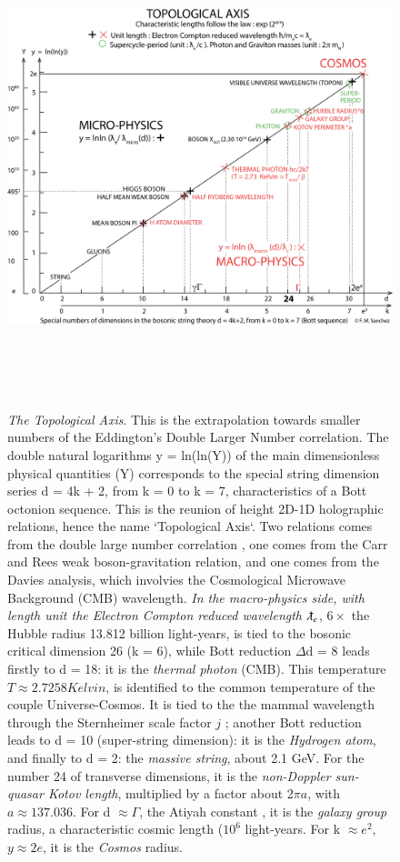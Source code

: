 \documentclass[a4paper,9pt]{article}
\begin{document}
\begin{appendix}
\begin{figure}
\label{fig:7:fig1}
\centering
\includegraphics[width=\textwidth,height=14cm]{./figure/figure}
\caption{\textit{The Topological Axis}. This is the extrapolation towards smaller numbers of the Eddington's Double Larger Number correlation. The double natural logarithms y = ln(ln(Y)) of the main dimensionless physical quantities (Y) corresponds to the special string dimension series d = 4k + 2, from k = 0 to k = 7, characteristics of a Bott octonion sequence. This is the reunion of height 2D-1D holographic relations, hence the name `Topological Axis`. Two relations comes from the double large number correlation \cite{Eddington}, one comes from the Carr and Rees weak boson-gravitation relation\cite{Carr}, and one comes from the Davies analysis, which involvies the Cosmological Microwave Background (CMB) wavelength. \textit{In the macro-physics side, with length unit  the Electron Compton reduced wavelength $\lambdabar_e$}, $6 \times$ the Hubble radius 13.812 billion light-years, is tied to the bosonic critical dimension 26 (k = 6), while Bott reduction $\Delta$d = 8 leads firstly to  d = 18: it is the \textit{thermal photon} (CMB). This temperature $T \approx 2.7258 Kelvin$, is identified to the common temperature of the couple Universe-Cosmos. It is tied to the the mammal wavelength through the Sternheimer scale factor $j$ \cite{Sternheimer}; another Bott reduction leads to d = 10 (super-string dimension): it is the \textit{Hydrogen atom}, and finally to d = 2: the \textit{massive string}, about 2.1 GeV. For the number 24 of transverse dimensions, it is the \textit{non-Doppler sun-quasar Kotov length}, multiplied by a factor about 2$\pi a$, with $a \approx 137.036$. For d $\approx \Gamma$, the Atiyah constant \cite{Atiyah}, it is the \textit{galaxy group} radius, a characteristic cosmic length ($10^{6}$ light-years. For k $\approx e^{2}$, $y \approx 2e$, it is the \textit{Cosmos} radius. 
}
\end{figure}
\end{appendix}
\end{document}
